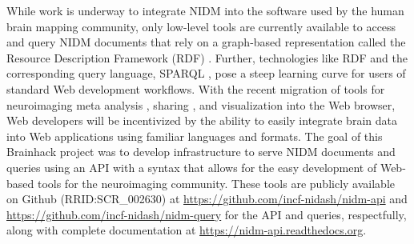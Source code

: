 \documentclass[twocolumn]{bmcart}%
\begin{document}
While work is underway to integrate NIDM into the software used by the human brain mapping community, only low-level tools are currently available to access and query NIDM documents that rely on a graph-based representation called the Resource Description Framework (RDF) \cite{noauthor_undated-hj}. Further, technologies like RDF and the corresponding query language, SPARQL \cite{noauthor_undated-cp}, pose a steep learning curve for users of standard Web development workflows. With the recent migration of tools for neuroimaging meta analysis \cite{Yarkoni2011-rg,Reid2015-gt}, sharing \cite{Crawford2016-zl,Landis2016-wo,Book2016-ro,Herrick2016-bw,Hodge2016-ht,Jernigan2016-dz,Kini2016-sg,Wang2016-nd,Gorgolewski2015-sf}, and visualization \cite{Gutman2014-hz,Gao2015-pz,noauthor_undated-ca} into the Web browser, Web developers will be incentivized by the ability to easily integrate brain data into Web applications using familiar languages and formats. The goal of this Brainhack project was to develop infrastructure to serve NIDM documents and queries using an API with a syntax that allows for the easy development of Web-based tools for the neuroimaging community. These tools are publicly available on Github (RRID:SCR\_002630) at \href{https://github.com/incf-nidash/nidm-api}{https://github.com/incf-nidash/nidm-api} and \href{https://github.com/incf-nidash/nidm-query}{https://github.com/incf-nidash/nidm-query} for the API and queries, respectfully, along with complete documentation at \href{https://nidm-api.readthedocs.org}{https://nidm-api.readthedocs.org}.
\end{document}
